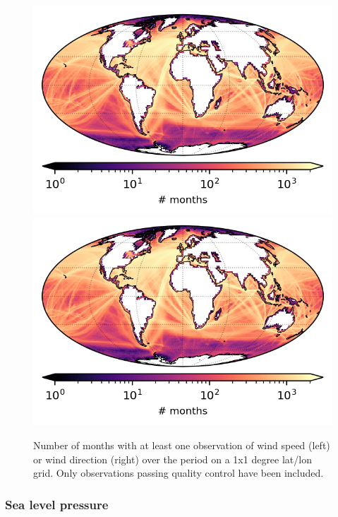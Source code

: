 \begin{figure}[h]
    \centering
    \includegraphics{resources/observations-ws-months-map-optimal.png}
    \includegraphics{resources/observations-wd-months-map-optimal.png}
    \caption{Number of months with at least one observation of wind speed (left) or wind direction (right) over the period \datatimerange{} on a 1x1 degree lat/lon grid. Only observations passing quality control have been included.\\}
    \label{fig:wspd-nmonths-map}
\end{figure}

\FloatBarrier
\subsubsection{Sea level pressure}

